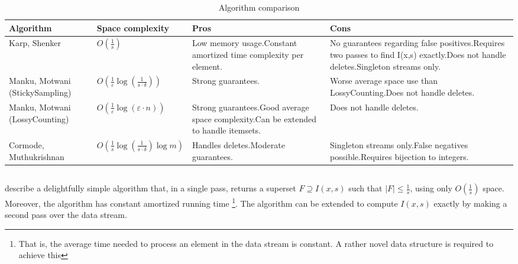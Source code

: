 \documentclass[landscape,twocolumn,a4paper]{article}
\begin{document}
\begin{center}
\begin{table*}[ht]
{\scriptsize 
\begin{tabular}{p{4.4cm} p{2.6cm} p{6cm} p{6cm}}
\hline \textbf{Algorithm}  %
& \textbf{Space complexity} 
& \textbf{Pros} & \textbf{Cons} \\ 
\hline Karp, Shenker %
& $O\left(\frac{1}{s}\right)$ 
& Low memory usage.\newline Constant amortized time complexity per element. & No guarantees regarding false positives.\newline Requires two passes to find I(x,s) exactly.\newline Does not handle deletes.\newline Singleton streams only. \\ 
\hline Manku, Motwani (StickySampling) %
& $O\left(\frac{1}{\varepsilon}\log \left(\frac{1}{s \cdot \delta}\right)\right)$ 
& Strong guarantees. & Worse average space use than LossyCounting.\newline Does not handle deletes. \\ 
\hline Manku, Motwani (LossyCounting) %
& $O\left(\frac{1}{\varepsilon}\log (\varepsilon \cdot n)\right)$ 
& Strong guarantees.\newline Good average space complexity.\newline Can be extended to handle itemsets.  & Does not handle deletes. \\ 
\hline Cormode, Muthukrishnan  %
& $O\left(\frac{1}{s} \log\left(\frac{1}{s\cdot \delta}\right) \log m\right)$ 
& Handles deletes.\newline Moderate guarantees. & Singleton streams only.\newline False negatives possible.\newline Requires bijection to integers. \\ 
\hline 

\end{tabular}
}
\caption{Algorithm comparison}
\label{ComparisonTable}
\end{table*}
\end{center}

\subsection{\cite{Karp:2003:SAF:762471.762473}}
\cite{Karp:2003:SAF:762471.762473} describe a delightfully simple algorithm that, in a single pass, returns a superset $F \supseteq I(x, s)$ such that $|F| \leq \frac{1}{s}$, using only $O(\frac{1}{s})$ space. Moreover, the algorithm has constant amortized running time \footnote{That is, the average time needed to process an element in the data stream is constant. A rather novel data structure is required to achieve this}. The algorithm can be extended to compute $I(x, s)$ exactly by making a second pass over the data stream.
\end{document}
